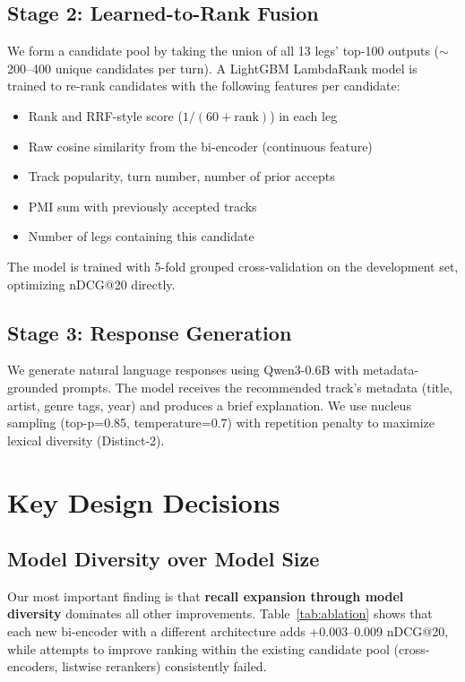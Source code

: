 \documentclass[sigconf]{acmart}
\begin{document}
\subsection{Stage 2: Learned-to-Rank Fusion}

We form a candidate pool by taking the union of all 13 legs' top-100 outputs ($\sim$200--400 unique candidates per turn). A LightGBM LambdaRank model is trained to re-rank candidates with the following features per candidate:

\begin{itemize}
    \item Rank and RRF-style score ($1/(60+\text{rank})$) in each leg
    \item Raw cosine similarity from the bi-encoder (continuous feature)
    \item Track popularity, turn number, number of prior accepts
    \item PMI sum with previously accepted tracks
    \item Number of legs containing this candidate
\end{itemize}

The model is trained with 5-fold grouped cross-validation on the development set, optimizing nDCG@20 directly.

\subsection{Stage 3: Response Generation}

We generate natural language responses using Qwen3-0.6B with metadata-grounded prompts. The model receives the recommended track's metadata (title, artist, genre tags, year) and produces a brief explanation. We use nucleus sampling (top-p=0.85, temperature=0.7) with repetition penalty to maximize lexical diversity (Distinct-2).

\section{Key Design Decisions}

\subsection{Model Diversity over Model Size}

Our most important finding is that \textbf{recall expansion through model diversity} dominates all other improvements. Table~\ref{tab:ablation} shows that each new bi-encoder with a different architecture adds +0.003--0.009 nDCG@20, while attempts to improve ranking within the existing candidate pool (cross-encoders, listwise rerankers) consistently failed.
\end{document}
